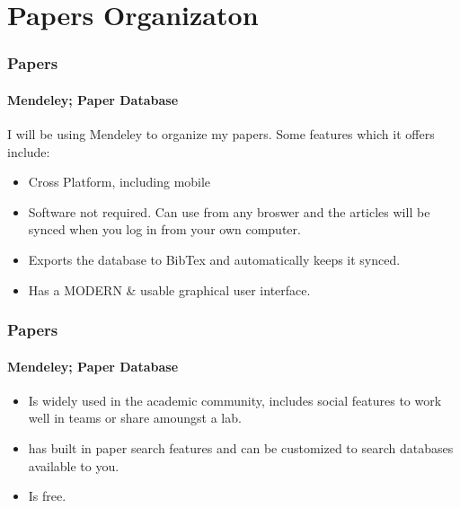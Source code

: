 \section{Papers Organizaton}

\begin{frame}
    \frametitle{Papers}
    \framesubtitle{Mendeley; Paper Database}
    I will be using Mendeley to organize my papers. Some features which it offers include: 
    \begin{itemize}
    	\item Cross Platform, including mobile
    	\item Software not required. Can use from any broswer and the articles will be synced when you log in from your own computer.
    	\item Exports the database to BibTex and automatically keeps it synced. 
    	\item Has a MODERN \& usable graphical user interface.
    \end{itemize}
\end{frame}

\begin{frame}
    \frametitle{Papers}
    \framesubtitle{Mendeley; Paper Database}
    \begin{itemize}
    	\item Is widely used in the academic community, includes social features to work well in teams or share amoungst a lab.
    	\item has built in paper search features and can be customized to search databases available to you. 
    	\item Is free.
    \end{itemize}
\end{frame}